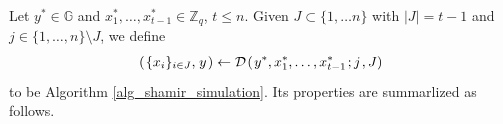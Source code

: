 \documentclass{iacrtrans}
\begin{document}
Let $y^* \in \mathbb{G}$ and
$x_1^*, \dots, x_{t-1}^* \in \mathbb{Z}_q$, $t \le n$.
Given $J \subset \{1, \dots n\}$ with $|J| = t-1$
and $j \in \{1, \dots, n\} \setminus J$,
we define
\vspace{5pt}
\begin{equation}\label{shamir_embedding_ref}
(\hspace{1pt}\{x_i\}_{i \in J},\hspace{1pt} y\hspace{1pt})
\leftarrow
\mathcal{D}\hspace{1pt}(
	\hspace{1pt}y^*,
	x_1^*, \dots, x_{t-1}^*
	\hspace{1pt};
	j\hspace{1pt},
	J
)
\vspace{0pt}
\end{equation}
to be Algorithm \ref{alg_shamir_simulation}.
Its properties are summarlized as follows.
\end{document}
